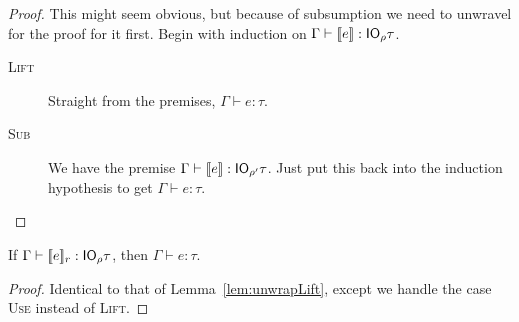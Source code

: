 \begin{proof}
  This might seem obvious, but because of subsumption we need to
  unwravel for the proof for it first. Begin with induction on $\Gamma \vdash
  \lift{e} : \IO_\rho \tau$.
  \begin{description}
  \item[\rm\textsc{Lift}] Straight from the premises, $\Gamma \vdash e : \tau$.
  \item[\rm\textsc{Sub}] We have the premise ${\Gamma \vdash \lift{e} : \IO_{\rho'}
    \tau}$. Just put this back into the induction hypothesis to get ${\Gamma \vdash e
    : \tau}$.
  \end{description}
\end{proof}

\begin{lemma}\label{lem:unwrapUse}
  If $\Gamma \vdash \use{r}{e} : \IO_\rho \tau$, then $\Gamma \vdash e : \tau$.
\end{lemma}
\begin{proof}
  Identical to that of Lemma~\ref{lem:unwrapLift}, except we handle
  the case \textsc{Use} instead of \textsc{Lift}.
\end{proof}